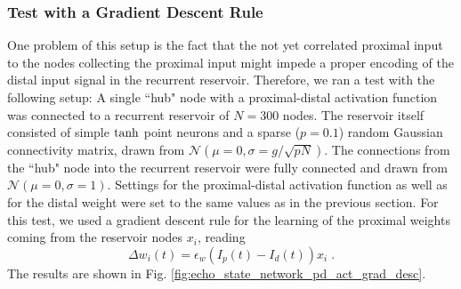 \documentclass[10pt,a4paper]{article}
\begin{document}
\subsubsection{Test with a Gradient Descent Rule}
One problem of this setup is the fact that the not yet correlated proximal input to the nodes collecting the proximal input might impede a proper encoding of the distal input signal in the recurrent reservoir. Therefore, we ran a test with the following setup: A single ``hub" node with a proximal-distal activation function was connected to a recurrent reservoir of $N=300$ nodes. The reservoir itself consisted of simple $\rm tanh$ point neurons and a sparse ($p=0.1$) random Gaussian connectivity matrix, drawn from $\mathcal{N}(\mu=0,\sigma=g/\sqrt{pN})$. The connections from the ``hub" node into the recurrent reservoir were fully connected and drawn from $\mathcal{N}(\mu=0,\sigma=1)$. Settings for the proximal-distal activation function as well as for the distal weight were set to the same values as in the previous section. For this test, we used a gradient descent rule for the learning of the proximal weights coming from the reservoir nodes $x_i$, reading
\begin{equation}
\Delta w_i(t) = \epsilon_w \left(I_p(t)-I_d(t)\right) x_i \;.
\end{equation}
The results are shown in Fig. \ref{fig:echo_state_network_pd_act_grad_desc}.
\end{document}
